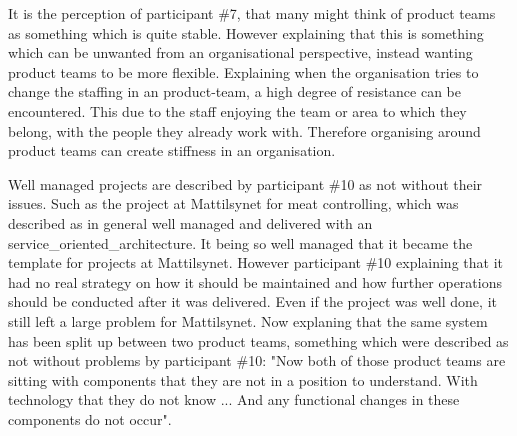 
It is the perception of participant \#7, that many might think of product teams as something which is quite stable. However explaining that this is something which can be unwanted from an organisational perspective, instead wanting product teams to be more flexible. Explaining when the organisation tries to change the staffing in an product-team, a high degree of resistance can be encountered. This due to the staff enjoying the team or area to which they belong, with the people they already work with. Therefore organising around product teams can create stiffness in an organisation.



Well managed projects are described by participant \#10 as not without their issues. Such as the project at Mattilsynet for meat controlling, which was described as in general well managed and delivered with an \gls{service_oriented_architecture}. It being so well managed that it became the template for projects at Mattilsynet. However participant \#10 explaining that it had no real strategy on how it should be maintained and how further operations should be conducted after it was delivered. Even if the project was well done, it still left a large problem for Mattilsynet. Now explaning that the same system has been split up between two product teams, something which were described as not without problems by participant \#10: "Now both of those product teams are sitting with components that they are not in a position to understand. With technology that they do not know ... And any functional changes in these components do not occur".


